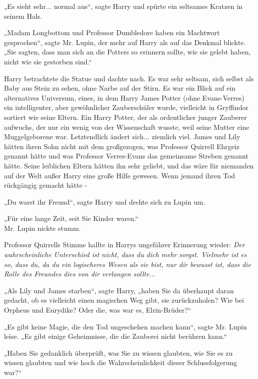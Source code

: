 {„Es sieht sehr... normal aus“, sagte Harry und spürte ein seltsames Kratzen in seinem Hals.

„Madam Longbottom und Professor Dumbledore haben ein Machtwort gesprochen“, sagte Mr. Lupin, der mehr auf Harry als auf das Denkmal blickte. „Sie sagten, dass man sich an die Potters so erinnern sollte, wie sie gelebt haben, nicht wie sie gestorben sind.“

Harry betrachtete die Statue und dachte nach. Es war sehr seltsam, sich selbst als Baby aus Stein zu sehen, ohne Narbe auf der Stirn. Es war ein Blick auf ein alternatives Universum, eines, in dem Harry James Potter (ohne Evans-Verres) ein intelligenter, aber gewöhnlicher Zauberschüler wurde, vielleicht in Gryffindor sortiert wie seine Eltern. Ein Harry Potter, der als ordentlicher junger Zauberer aufwuchs, der nur ein wenig von der Wissenschaft wusste, weil seine Mutter eine Muggelgeborene war. Letztendlich ändert sich... ziemlich viel. James und Lily hätten ihren Sohn nicht mit dem großgezogen, was Professor Quirrell Ehrgeiz genannt hätte und was Professor Verres-Evans das gemeinsame Streben genannt hätte. Seine leiblichen Eltern hätten ihn sehr geliebt, und das wäre für niemanden auf der Welt außer Harry eine große Hilfe gewesen. Wenn jemand ihren Tod rückgängig gemacht hätte -

„Du warst ihr Freund“, sagte Harry und drehte sich zu Lupin um.

„Für eine lange Zeit, seit Sie Kinder waren.“\\ Mr. Lupin nickte stumm.

Professor Quirrells Stimme hallte in Harrys ungefährer Erinnerung wieder: \emph{Der wahrscheinliche Unterschied ist nicht, dass du dich mehr sorgst. Vielmehr ist es so, dass du, da du ein logischeres Wesen als sie bist, nur dir bewusst ist, dass die Rolle des Freundes dies von dir verlangen sollte...}

„Als Lily und James starben“, sagte Harry, „haben Sie da überhaupt daran gedacht, ob es vielleicht einen magischen Weg gibt, sie zurückzuholen? Wie bei Orpheus und Eurydike? Oder die, was war es, Elrin-Brüder?“

„Es gibt keine Magie, die den Tod ungeschehen machen kann“, sagte Mr. Lupin leise. „Es gibt einige Geheimnisse, die die Zauberei nicht berühren kann.“

„Haben Sie gedanklich überprüft, was Sie zu wissen glaubten, wie Sie es zu wissen glaubten und wie hoch die Wahrscheinlichkeit dieser Schlussfolgerung war?“

}
